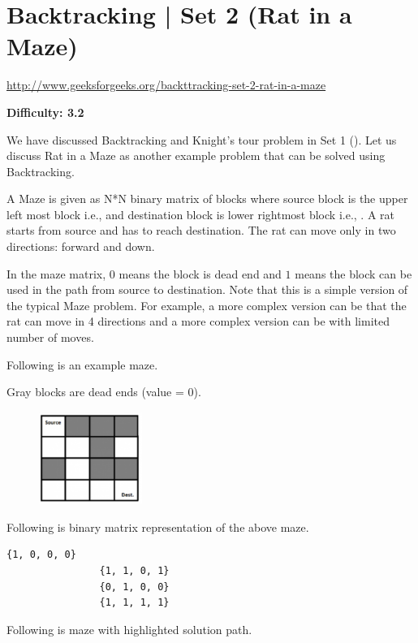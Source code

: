 \textbf{}



\section{Backtracking | Set 2 (Rat in a Maze)
  \label{secGFGBktrckSet2RatInMaze}}

\url{http://www.geeksforgeeks.org/backttracking-set-2-rat-in-a-maze}

\textbf{Difficulty: 3.2}

We have discussed Backtracking and Knight's tour problem in Set 1
(). Let us discuss Rat in a Maze as
another example problem that can be solved using Backtracking.

A Maze is given as N*N binary matrix of blocks where source block is the
upper left most block i.e.,  and destination block is lower
rightmost block i.e., . A rat starts from source and has
to reach destination. The rat can move only in two directions: forward and
down.

In the maze matrix, $0$ means the block is dead end and $1$ means the block
can be used in the path from source to destination. Note that this is a
simple version of the typical Maze problem. For example, a more complex
version can be that the rat can move in 4 directions and a more complex
version can be with limited number of moves.

Following is an example maze.

Gray blocks are dead ends (value = $0$). 

\begin{figure}
\centering
\includegraphics[width=0.3\textwidth]{Images/figGFGBkTSet2RatMaze1}
\end{figure}

Following is binary matrix representation of the above maze.
\begin{lstlisting}[style=raygeneric]
                {1, 0, 0, 0}
                {1, 1, 0, 1}
                {0, 1, 0, 0}
                {1, 1, 1, 1}
\end{lstlisting}
Following is maze with highlighted solution path.

